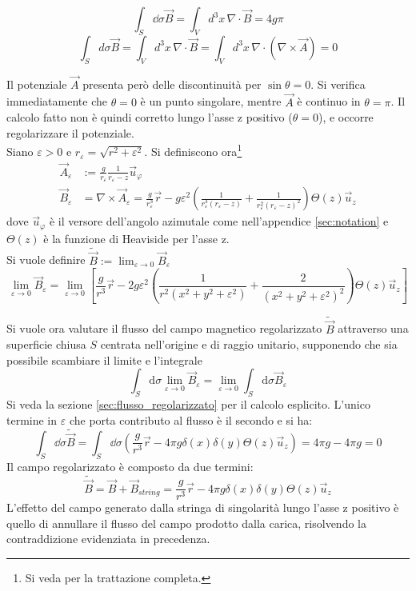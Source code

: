 \begin{equation}\label{eq:B4gpi}
   \int_S \dd\sigma \vec B = \int_V d^3 x \, \nabla \cdot \vec B = 4g\pi
\end{equation}
\begin{equation}
   \int_S d\sigma  \vec B = \int_V d^3 x \, \nabla \cdot \vec B
      = \int_V d^3 x \, \nabla \cdot (\nabla \times \vec A) = 0
\end{equation}

Il potenziale $\vec A$ presenta però delle discontinuità per $\sin\theta = 0$.
Si verifica immediatamente che $\theta = 0$ è un punto singolare, mentre $\vec A$
è continuo in $\theta = \pi$. Il calcolo fatto non è quindi corretto lungo l'asse z
positivo ($\theta = 0$), e occorre regolarizzare il potenziale.\\
Siano $\varepsilon > 0$  e $r_\varepsilon = \sqrt{r^2 + \varepsilon^2}$.
Si definiscono ora\footnote{Si veda \cite{shnir} per la trattazione completa.}
%
\begin{align*}
   \vec A_\varepsilon &:= \frac{g}{r_\varepsilon}\frac{1}{r_\varepsilon - z} \vec u _\varphi  \\
   \vec B _\varepsilon & = \nabla \times \vec A_\varepsilon = \frac{g}{r_\varepsilon^3}\vec r
      - g\varepsilon^2 \left( \frac{1}{r_\varepsilon^3(r_\varepsilon - z)}
         + \frac{1}{r_\varepsilon^2(r_\varepsilon-z)^2} \right) \Theta(z) \vec u _z
\end{align*}
%
dove $\vec u _\varphi $ è il versore dell'angolo azimutale come nell'appendice
\ref{sec:notation} e $\Theta(z)$ è la funzione di Heaviside per l'asse z.\\
Si vuole definire $\tilde{\vec B} := \lim_{\varepsilon \to 0} \vec B _\varepsilon$
%
$$
   \lim_{\varepsilon \to 0} \vec B_\varepsilon = \lim_{\varepsilon \to 0} \left[
      \frac{g}{r^3}\vec r - 2g\varepsilon^2 \left( \frac{1}{r^2(x^2 + y^2 + \varepsilon^2)}
            + \frac{2}{(x^2 + y^2 + \varepsilon^2)^2} \right) \Theta(z) \vec u _z \right]
$$
%

Si vuole ora valutare il flusso del campo magnetico regolarizzato $\tilde{\vec B}$
attraverso una superficie chiusa $S$ centrata nell'origine e di raggio unitario, supponendo
che sia possibile scambiare il limite e l'integrale
%
$$
  \int_S \mathrm{d}{\sigma} \lim_{\varepsilon \to 0} \vec B_\varepsilon = \lim_{\varepsilon \to 0} \int_S \mathrm{d}\sigma \vec B_\varepsilon
$$
%
Si veda la sezione \ref{sec:flusso_regolarizzato} per il calcolo esplicito.
L'unico termine in $\varepsilon$ che porta contributo al flusso è il secondo e si
ha:
$$
   \int_S \dd\sigma \tilde{\vec B}
      = \int_S \dd \sigma \left( \frac{g}{r^3}\vec r
         - 4\pi g \delta(x)\delta(y)\Theta(z) \vec u _z \right)
      = 4\pi g - 4\pi g = 0
$$
%
Il campo regolarizzato è composto da due termini:
$$
   \tilde{\vec B} = \vec B + \vec B _{string} = \frac{g}{r^3}\vec r
      - 4\pi g \delta(x)\delta(y)\Theta(z) \vec u _z
$$
L'effetto del campo generato dalla stringa di singolarità lungo l'asse z positivo
è quello di annullare il flusso del campo prodotto dalla carica, risolvendo la
contraddizione evidenziata in precedenza.

